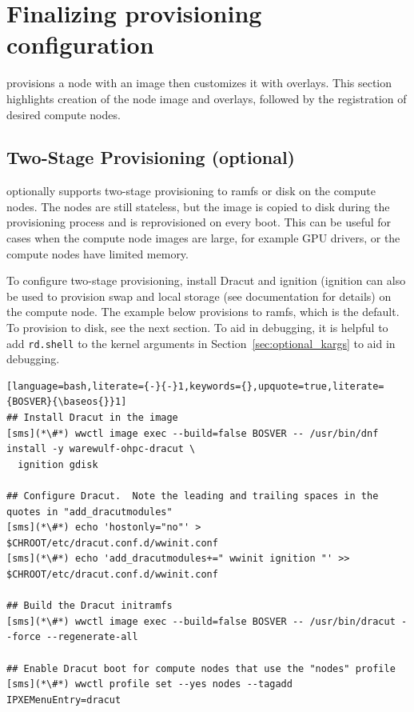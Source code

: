 \section{Finalizing provisioning configuration} \label{sec:assemble_bootstrap}

\Warewulf{} provisions a node with an image then customizes it with overlays.
This section highlights creation of the node image and overlays, followed by the
registration of desired compute nodes.

\subsection{Two-Stage Provisioning (optional)}

\Warewulf{} optionally supports two-stage provisioning to ramfs or disk on the
compute nodes. The nodes are still stateless, but the image is copied to disk
during the provisioning process and is reprovisioned on every boot.  This can be
useful for cases when the compute node images are large, for example GPU
drivers, or the compute nodes have limited memory.

To configure two-stage provisioning, install Dracut and ignition (ignition can
also be used to provision swap and local storage (see \Warewulf{} documentation
for details) on the compute node.  The example below provisions to ramfs, which
is the default.  To provision to disk, see the next section.  To aid in
debugging, it is helpful to add \texttt{rd.shell} to the kernel arguments in
Section~\ref{sec:optional_kargs} to aid in debugging.


\begin{lstlisting}[language=bash,literate={-}{-}1,keywords={},upquote=true,literate={BOSVER}{\baseos{}}1]
## Install Dracut in the image
[sms](*\#*) wwctl image exec --build=false BOSVER -- /usr/bin/dnf install -y warewulf-ohpc-dracut \
  ignition gdisk

## Configure Dracut.  Note the leading and trailing spaces in the quotes in "add_dracutmodules"
[sms](*\#*) echo 'hostonly="no"' > $CHROOT/etc/dracut.conf.d/wwinit.conf
[sms](*\#*) echo 'add_dracutmodules+=" wwinit ignition "' >> $CHROOT/etc/dracut.conf.d/wwinit.conf

## Build the Dracut initramfs
[sms](*\#*) wwctl image exec --build=false BOSVER -- /usr/bin/dracut --force --regenerate-all

## Enable Dracut boot for compute nodes that use the "nodes" profile
[sms](*\#*) wwctl profile set --yes nodes --tagadd IPXEMenuEntry=dracut
\end{lstlisting}

